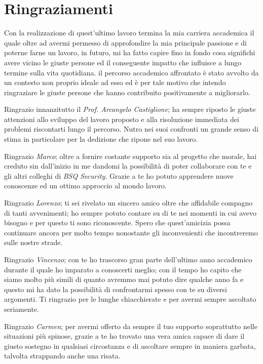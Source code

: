 \chapter{Ringraziamenti}

Con la realizzazione di quest'ultimo lavoro termina la mia carriera accademica il quale oltre ad avermi permesso di approfondire la mia principale passione e di poterne farne un lavoro, in futuro, mi ha fatto capire fino in fondo cosa significhi avere vicino le giuste persone ed il conseguente impatto che influisce a lungo termine sulla vita quotidiana. il percorso accademico affrontato è stato avvolto da un contesto non proprio ideale ad esso ed è per tale motivo che intendo ringraziare le giuste persone che hanno contribuito positivamente a migliorarlo.

Ringrazio innanzitutto il \emph{Prof. Arcangelo Castiglione}; ha sempre riposto le giuste attenzioni allo sviluppo del lavoro proposto e alla risoluzione immediata dei problemi riscontarti lungo il percorso. Nutro nei suoi confronti un grande senso di stima in particolare per la dedizione che ripone nel suo lavoro.

Ringrazio \emph{Marco}; oltre a fornire costante supporto sia al progetto che morale, hai creduto sin dall'inizio in me dandomi la possibilità di poter collaborare con te e gli altri colleghi di \emph{BSQ Security}. Grazie a te ho potuto apprendere nuove conoscenze ed un ottimo approccio al mondo lavoro.

Ringrazio \emph{Lorenzo}; ti sei rivelato un sincero amico oltre che affidabile compagno di tanti avvenimenti; ho sempre potuto contare su di te nei momenti in cui avevo bisogno e per questo ti sono riconoscente. Spero che quest'amicizia possa continuare ancora per molto tempo nonostante gli inconvenienti che incontreremo sulle nostre strade.

Ringrazio \emph{Vincenzo}; con te ho trascorso gran parte dell'ultimo anno accademico durante il quale ho imparato a conoscerti meglio; con il tempo ho capito che siamo molto più simili di quanto avremmo mai potuto dire qualche anno fa e questo mi ha dato la possibilità di confrontarmi spesso con te su diversi argomenti. Ti ringrazio per le lunghe chiacchierate e per avermi sempre ascoltato seriamente. 

Ringrazio \emph{Carmen}; per avermi offerto da sempre il tuo supporto soprattutto nelle situazioni più spinose, grazie a te ho trovato una vera amica capace di dare il giusto sostegno in qualsiasi circostanza e di ascoltare sempre in maniera garbata, talvolta strappando anche una risata. 

